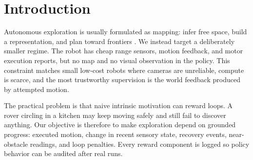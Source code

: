 \documentclass{article}
\begin{document}

\printAffiliationsAndNotice{}

\begin{abstract}
We study real-world exploration under an intentionally weak sensing budget: no camera input to the policy, no LiDAR, no SLAM, and no reconstructed map. A small rover must choose local actions from only onboard range, inertial, action-history, and executor-feedback signals. The proposed direction, Tiny World Feedback (TWF), replaces visual-memory exploration with a compact sensory encoder, recurrent state, and SAC local-heading policy. The central claim is not that vision is unnecessary in general, but that useful exploration behavior can emerge from auditable world feedback when the policy is forced to rely on what the robot physically experienced. This paper is being rewritten around the resulting question: how far can a tiny visionless rover explore before mapping or perception-heavy representations become necessary?
\end{abstract}

\section{Introduction}

Autonomous exploration is usually formulated as mapping: infer free space, build a representation, and plan toward frontiers \citep{yamauchi1997frontier,thrun2005probabilistic}. We instead target a deliberately smaller regime. The robot has cheap range sensors, motion feedback, and motor execution reports, but no map and no visual observation in the policy. This constraint matches small low-cost robots where cameras are unreliable, compute is scarce, and the most trustworthy supervision is the world feedback produced by attempted motion.

The practical problem is that naive intrinsic motivation can reward loops. A rover circling in a kitchen may keep moving safely and still fail to discover anything. Our objective is therefore to make exploration depend on grounded progress: executed motion, change in recent sensory state, recovery events, near-obstacle readings, and loop penalties. Every reward component is logged so policy behavior can be audited after real runs.
\end{document}
